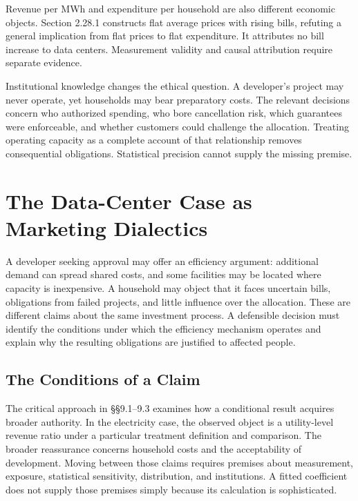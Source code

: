 Revenue per MWh and expenditure per household are also different
economic objects. Section 2.28.1 constructs flat average prices with
rising bills, refuting a general implication from flat prices to flat
expenditure. It attributes no bill increase to data centers. Measurement
validity and causal attribution require separate evidence.

Institutional knowledge changes the ethical question. A developer's
project may never operate, yet households may bear preparatory costs.
The relevant decisions concern who authorized spending, who bore
cancellation risk, which guarantees were enforceable, and whether
customers could challenge the allocation. Treating operating capacity as
a complete account of that relationship removes consequential
obligations. Statistical precision cannot supply the missing premise.


\hypertarget{M09-the-data-center-case-as-marketing-dialectics}{%
\section{The Data-Center Case as Marketing
Dialectics}\label{M09-the-data-center-case-as-marketing-dialectics}}

\noindent \noindent A developer seeking approval may offer an efficiency argument:
additional demand can spread shared costs, and some facilities may be
located where capacity is inexpensive. A household may object that it
faces uncertain bills, obligations from failed projects, and little
influence over the allocation. These are different claims about the same
investment process. A defensible decision must identify the conditions
under which the efficiency mechanism operates and explain why the
resulting obligations are justified to affected people.

\hypertarget{M09-the-conditions-of-a-claim}{%
\subsection{The Conditions of a
Claim}\label{M09-the-conditions-of-a-claim}}

\noindent \noindent The critical approach in §§9.1--9.3 examines how a conditional
result acquires broader authority. In the electricity case, the observed
object is a utility-level revenue ratio under a particular treatment
definition and comparison. The broader reassurance concerns household
costs and the acceptability of development. Moving between those claims
requires premises about measurement, exposure, statistical sensitivity,
distribution, and institutions. A fitted coefficient does not supply
those premises simply because its calculation is sophisticated.

